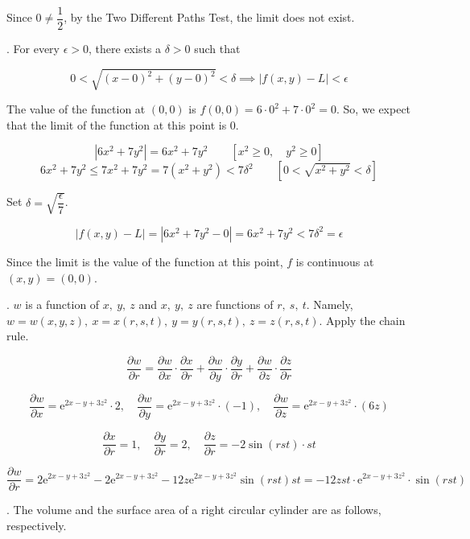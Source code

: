 \documentclass{article}
\begin{document}
\hfill

\noindent Since $0\neq\dfrac12$, by the Two Different Paths Test, the limit does not exist.

\hfill

. For every $\epsilon>0$, there exists a $\delta>0$ such that

\[0<\sqrt{(x-0)^2+(y-0)^2}<\delta\implies\left|f(x,y)-L\right|<\epsilon\]

\hfill

\noindent The value of the function at $(0,0)$ is $f(0,0)=6\cdot0^2+7\cdot0^2=0$. So, we expect that the limit of the function at this point is $0$.

\[\left|6x^2+7y^2\right|=6x^2+7y^2\qquad\left[x^2\geq0,\quad y^2\geq0\right]\]
\[6x^2+7y^2\leq7x^2+7y^2=7\left(x^2+y^2\right)<7\delta^2\qquad\left[0<\sqrt{x^2+y^2}<\delta\right]\]

\hfill

\noindent Set $\delta=\sqrt{\dfrac\epsilon7}$.

\[\left|f(x,y)-L\right|=|6x^2+7y^2-0|=6x^2+7y^2<7\delta^2=\epsilon\]

\hfill

\noindent Since the limit is the value of the function at this point, $f$ is continuous at $(x,y)=(0,0)$.

\hfill

. $w$ is a function of $x,\:y,\:z$ and $x,\:y,\:z$ are functions of $r,\:s,\:t$. Namely, $w=w(x,y,z),\:x=x(r,s,t),\:y=y(r,s,t),\:z=z(r,s,t)$. Apply the chain rule.

\[\frac{\partial w}{\partial r}=\frac{\partial w}{\partial x}\cdot\frac{\partial x}{\partial r}+\frac{\partial w}{\partial y}\cdot\frac{\partial y}{\partial r}+\frac{\partial w}{\partial z}\cdot\frac{\partial z}{\partial r}\]

\[\frac{\partial w}{\partial x}=\mathrm{e}^{2x-y+3z^2}\cdot2,\quad\frac{\partial w}{\partial y}=\mathrm{e}^{2x-y+3z^2}\cdot(-1),\quad\frac{\partial w}{\partial z}=\mathrm{e}^{2x-y+3z^2}\cdot(6z)\]

\[\frac{\partial x}{\partial r}=1,\quad\frac{\partial y}{\partial r}=2,\quad\frac{\partial z}{\partial r}=-2\sin(rst)\cdot st\]

\[\frac{\partial w}{\partial r}=2\mathrm{e}^{2x-y+3z^2}-2\mathrm{e}^{2x-y+3z^2}-12z\mathrm{e}^{2x-y+3z^2}\sin(rst)st=\boxed{-12zst\cdot\mathrm{e}^{2x-y+3z^2}\cdot\sin(rst)}\]

\hfill

. The volume and the surface area of a right circular cylinder are as follows, respectively.
\end{document}
